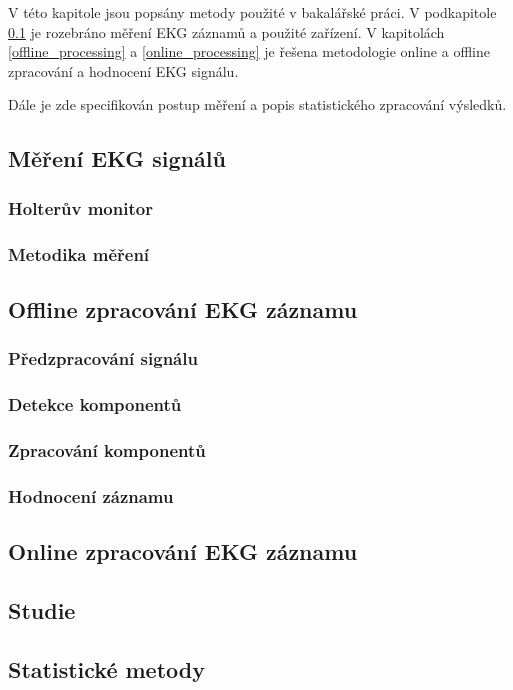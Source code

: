 V této kapitole jsou popsány metody použité v bakalářské práci. V podkapitole
\ref{section:measurement} je rozebráno měření EKG záznamů a použité zařízení. V
kapitolách \ref{offline_processing} a \ref{online_processing} je řešena
metodologie online a offline zpracování a hodnocení EKG signálu. 

Dále je zde
specifikován postup měření a popis statistického zpracování výsledků. 

\subsection{Měření EKG signálů}
\label{section:measurement}
\subsubsection{Holterův monitor}
\subsubsection{Metodika měření}

\subsection{Offline zpracování EKG záznamu}
\label{section:offline_processing}
\subsubsection{Předzpracování signálu}
\subsubsection{Detekce komponentů}
\subsubsection{Zpracování komponentů}
\subsubsection{Hodnocení záznamu}

\subsection{Online zpracování EKG záznamu}
\label{section:online_processing}
\subsection{Studie}
\label{section:}
\subsection{Statistické metody}
\label{section:statistics}